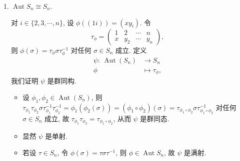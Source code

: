 \begin{enumerate}
\begin{enumerate}[label=(\arabic*)]
\begin{solution}
    记 $H_m$ 为 $S_n$ 中由所有 $m$ 个不交的对换的乘积构成的集合,
    则由于 $\phi$ 是同构, 故将共轭类映为共轭类.
    由于 $S_n$ 中所有$2$阶元均在某个 $H_i$ 中,
    故 $\phi(H_1)=H_k$ 对某个 $k\leqslant\frac{n}{2}$ 成立.
    而
    \begin{align*}
        |H_1| &= \binom{n}{2}, \\
        |H_k| &= \frac{1}{k!}\prod_{j=0}^{k-1}\binom{n-2j}{2},
    \end{align*}
    当 $n=4$, 时, $|H_1| = 6$, $|H_2| = 3$, 故 $k=1$,
    从而 $\phi$ 将对换映为对换. 
    当 $n=5$ 或 $n\geqslant 7$ 时, 
    \begin{align*}
        \frac{1}{k!}\prod_{j=0}^{k-1}\binom{n-2j}{2}
        &\geqslant \frac{1}{2^{k-1}k!}\binom{n}{2}\prod_{j=n-2k+1}^{n-2}j \\
        &\geqslant \binom{n}{2}\frac{(2k-3)!!}{k} \\
        &> \binom{n}{2},
    \end{align*}
    故 $k=1$. 
\end{solution}
\item $\operatorname{Aut}S_n \cong S_n$.
\begin{solution}
    对 $i\in\{2,3,\cdots,n\}$, 设 $\phi((1i))=(xy_i)$.
    令
    $$\tau_{\phi} = 
    \begin{pmatrix}
        1 & 2 & \cdots & n \\
        x & y_2 & \cdots & y_n
    \end{pmatrix}, $$
    则 $\phi(\sigma)=\tau_\phi\sigma\tau_\phi^{-1}$ 对任何 $\sigma\in S_n$ 成立.
    定义
    \begin{align*}
        \psi:\ \operatorname{Aut}(S_n) &\to S_n \\
        \phi &\mapsto \tau_{\phi}, 
    \end{align*}
    我们证明 $\psi$ 是群同构.
    \begin{itemize}
        \item
        设 $\phi_1,\phi_2\in\operatorname{Aut}(S_n)$,
        则 $\tau_{\phi_1}\tau_{\phi_2}\sigma\tau_{\phi_1}^{-1}\tau_{\phi_2}^{-1} = \phi_1(\phi_2(\sigma)) = (\phi_1\circ\phi_2)(\sigma) = \tau_{\phi_1\circ\phi_2}\sigma\tau_{\phi_1\circ\phi_2}^{-1}$ 对任何 $\sigma\in S_n$ 成立,
        故 $\tau_{\phi_1}\tau_{\phi_2}=\tau_{\phi_1\circ\phi_2}$,
        从而 $\psi$ 是群同态. 
        \item
        显然 $\psi$ 是单射.
        \item 若设 $\tau\in S_n$, 令 $\phi(\sigma)=\tau\sigma\tau^{-1}$,
        则 $\phi\in\operatorname{Aut}S_n$, 故 $\psi$ 是满射.

\end{itemize}
\end{solution}
\end{enumerate}
\end{enumerate}

